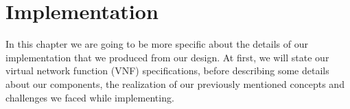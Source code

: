\chapter{Implementation}
\label{implementation}

In this chapter we are going to be more specific about the details of our implementation that we produced from our design. At first, we will state our virtual network function (VNF) specifications, before describing some details about our components, the realization of our previously mentioned concepts and challenges we faced while implementing.

